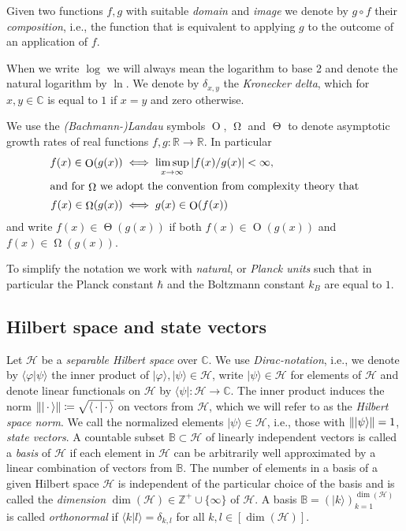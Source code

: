 \documentclass[a4paper,12pt,listof=totoc,index=totoc,bibliography=totoc,headsepline=false,headings=normal,BCOR16.153846mm,DIV12,headinclude,twoside,cleardoublepage=empty,numbers=noenddot,final]{scrreprt}
\theoremstyle{mystyle}
\numberwithin{equation}{section}
\numberwithin{figure}{section}
\numberwithin{lemma}{section}
\numberwithin{theorem}{section}
\numberwithin{corollary}{section}
\numberwithin{definition}{section}
\numberwithin{conjecture}{section}
\numberwithin{observation}{section}
\newcommand{\+}{\mkern2mu}
\newcommand{\coloneqq}{\mathrel{\vcentcolon\mkern-1.2mu=}} %
\newcommand{\union}{\cup}
\newcommand{\argdot}{{\,\cdot\,}}
\newcommand{\oftype}{\colon}
\newcommand{\Basis}{\mathds{B}}
\newcommand{\bra}[1]{\langle #1|}
\newcommand{\ket}[1]{|#1\rangle}
\newcommand{\braket}[2]{\langle #1 | #2 \rangle}
\newcommand{\norm}[2][]{
  \ifthenelse{\equal{#1}{}}
    {\left\| {#2} \right\|}
    {\ifthenelse{\equal{#1}{uinv}}
      {\left\vert\kern-0.25ex\left\vert\kern-0.25ex\left\vert {#2} \right\vert\kern-0.25ex\right\vert\kern-0.25ex\right\vert}
      {\left\| {#2} \right\|_{#1}}
    }
}
\DeclareMathOperator{\landauO}{O}
\DeclareMathOperator{\landauOmega}{\Omega}
\DeclareMathOperator{\landauTheta}{\Theta}
\DeclareMathOperator{\1}{\mathds{1}}
\newcommand{\mc}[1]{\mathcal{#1}}
\newcommand{\mcH}{\mc{H}}
\newcommand{\mb}[1]{\mathbb{#1}}
\newcommand{\Z}{\mb{Z}}
\newcommand{\R}{\mb{R}}
\renewcommand{\C}{\mb{C}} %
\begin{document}
Given two functions $f,g$ with suitable \emph{domain} and \emph{image} we denote by $g \circ f$ their \emph{composition}, i.e., the function that is equivalent to applying $g$ to the outcome of an application of $f$.

When we write $\log$ we will always mean the logarithm to base 2 and denote the natural logarithm by $\ln$.
We denote by $\delta_{x,y}$ the \emph{Kronecker delta}, which for $x,y \in \C$ is equal to $1$ if $x=y$ and zero otherwise.

We use the \emph{(Bachmann-)Landau} symbols $\landauO$, $\landauOmega$ and $\landauTheta$ to denote asymptotic growth rates of real functions $f,g\oftype\R\to\R$.
In particular
\begin{align}
  f(x) \in \landauO(g(x)) &\iff \limsup_{x\to\infty}|f(x)/g(x)| < \infty ,\\
\intertext{and for $\landauOmega$ we adopt the convention from complexity theory that}
  f(x) \in \landauOmega(g(x)) &\iff g(x) \in \landauO(f(x))
\end{align}
and write $f(x) \in \landauTheta(g(x))$ if both $f(x) \in \landauO(g(x))$ and $f(x) \in \landauOmega(g(x))$.

To simplify the notation we work with \emph{natural}, or \emph{Planck units} such that in particular the Planck constant $\hbar$ and the Boltzmann constant $k_B$ are equal to $1$.


\subsection{Hilbert space and state vectors}
\label{sec:hilbertspaceandstatevectos}
%
Let $\mcH$ be a \emph{separable Hilbert space} over $\C$.
We use \emph{Dirac-notation}, i.e., we denote by $\braket\varphi\psi$ the inner product of $\ket\varphi,\ket\psi\in\mcH$, write $\ket\psi \in \mcH$ for elements of $\mcH$ and denote linear functionals on $\mcH$ by $\bra\psi\oftype\mcH\to\C$.
The inner product induces the norm $\norm{\ket\argdot} \coloneqq \sqrt{\braket{\argdot}{\argdot}}$ on vectors from $\mcH$, which we will refer to as the \emph{Hilbert space norm}.
We call the normalized elements $\ket\psi\in\mcH$, i.e., those with $\norm{\ket\psi} = 1$, \emph{state vectors}.
A countable subset $\Basis \subset \mcH$ of linearly independent vectors is called a \emph{basis} of $\mcH$ if each element in $\mcH$ can be arbitrarily well approximated by a linear combination of vectors from $\Basis$.
The number of elements in a basis of a given Hilbert space $\mcH$ is independent of the particular choice of the basis and is called the \emph{dimension} $\dim(\mcH) \in \Z^+ \union \{\infty\}$ of $\mcH$.
A basis $\Basis = (\ket k)_{k=1}^{\dim(\mcH)}$ is called \emph{orthonormal} if $\braket k l = \delta_{k,l}$ for all $k,l\in [\dim(\mcH)]$.
\end{document}
